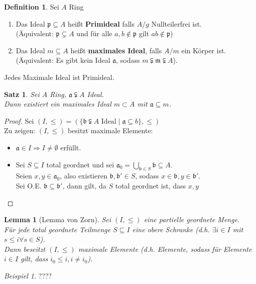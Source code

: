 \documentclass[10pt,a4paper]{article}
\newcounter{thm}[section]
\theoremstyle{definition}
\newtheorem{definition}[thm]{Definition}
\theoremstyle{plain}
\newtheorem{lem}[thm]{Lemma}
\newtheorem{satz}[thm]{Satz}
\theoremstyle{remark}
\newtheorem*{exm*}{Beispiel}
\begin{document}
\begin{definition}
	Sei $A$ Ring
	\begin{enumerate}
		\item Das Ideal $\mathfrak p\subseteq A$ heißt \textbf{Primideal} falls $A/g$ Nullteilerfrei ist.\\
		(Äquivalent: $\mathfrak p\subsetneq A$ und für alle $a,b\notin\mathfrak p$ gilt $ab\notin\mathfrak p$)
		\item Das Ideal $m\subseteq A$ heißt \textbf{maximales Ideal}, falls $A/m$ ein Körper ist.\\
		(Äquivalent: Es gibt kein Ideal $\mathfrak a$, sodass $m\subsetneqq\mathfrak m\subsetneqq A$).
	\end{enumerate}
	Jedes Maximale Ideal ist Primideal.
\end{definition}

\begin{satz}
	Sei $A$ Ring, $\mathfrak a\subsetneqq A$ Ideal.\\
	Dann existiert ein maximales Ideal $m\subset A$ mit $\mathfrak a\subseteq m$.
\end{satz}
\begin{proof}
	Sei $(I,\leq)=\left(\{\text{$\mathfrak b\subsetneqq A$ Ideal}\mid\mathfrak a\subseteq b\},\leq \right)$\\
	Zu zeigen: $(I,\leq)$ besitzt maximale Elemente:
	\begin{itemize}
		\item $\mathfrak a\in I\Rightarrow I\neq \emptyset$ erfüllt.
		\item Sei $S\subseteq I$ total geordnet und sei $\mathfrak a_0=\bigcup_{\mathfrak b\in S}\mathfrak b\subseteq A$.\\
		Seien $x,y\in\mathfrak a_0$, also existieren $\mathfrak b,\mathfrak b'\in S$, sodass $x\in \mathfrak b,y\in\mathfrak b'$.\\
		Sei O.E. $\mathfrak b\subseteq\mathfrak b'$, dann gilt, da $S$ total geordnet ist, dass $x,y$
	\end{itemize}
\end{proof}


\begin{lem}[Lemma von Zorn]\label{104LemZorn}
	Sei $(I,\leq)$ eine partielle geordnete Menge.\\
	Für jede total geordnete Teilmenge $S\subseteq I$  eine obere Schranke (d.h. $\exists i\in I$ mit $s\leq i\forall s\in S$).\\
	Dann beseitzt $(I,\leq)$ maximale Elemente (d.h. Elemente, sodass für Elemente $i\in I$ gilt, dass $i_0\leq i,i\neq i_0$).
\end{lem}
\begin{exm*}
	????
\end{exm*}
\end{document}
